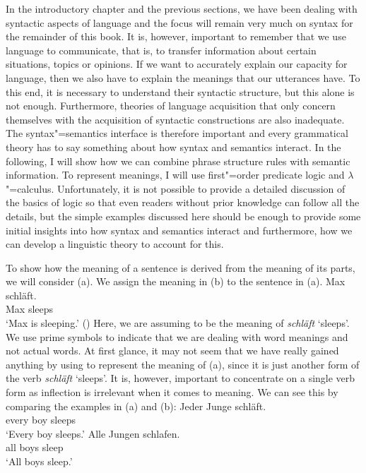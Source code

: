 In the introductory chapter and the previous sections, we have been dealing with syntactic aspects
of language and the focus will remain very much on syntax for the remainder of this book. It is,
however, important to remember that we use language to communicate, that is, to transfer information
about certain situations, topics or opinions. If we want to accurately explain our capacity for
language, then we also have to explain the meanings that our utterances have. To this end, it is
necessary to understand their syntactic structure, but this alone is not enough. Furthermore,
theories of language acquisition that only concern themselves with the acquisition of syntactic
constructions are also inadequate. The syntax"=semantics interface
is therefore important and every grammatical theory has to say something about how syntax and
semantics interact. In the following, I will show how we can combine phrase structure rules with
semantic information. To represent meanings, I will use first"=order predicate logic and
$\lambda$"=calculus. Unfortunately, it is not possible to provide a detailed
discussion of the basics of logic so that even readers without prior knowledge can follow all the
details, but the simple examples discussed here should be enough to provide some initial
insights into how syntax and semantics interact and furthermore, how we can develop a linguistic
theory to account for this.

To show how the meaning of a sentence is derived from the meaning of its parts, we will consider (a). We
assign the meaning in (b) to the sentence in (a). 
\eal
\ex\label{Bsp-Max-schlaeft}
\gll Max schläft.\\
     Max sleeps\\
\glt `Max is sleeping.'
\ex\label{Bsp-schlafen-max} 
()
\zl
Here, we are assuming  to be the meaning of  \emph{schläft} `sleeps'. We use prime symbols to indicate
that we are dealing with word meanings and not actual words. At first glance, it may not seem that we have really gained anything
by using  to represent the meaning of (a), since it is just another form of the verb \emph{schläft} `sleeps'.
It is, however, important to concentrate on a single verb form as inflection is irrelevant when it comes to meaning. We can see this by comparing the 
examples in (a) and (b):
\eal
\ex 
\gll Jeder Junge schläft.\\
     every boy sleeps\\
\glt `Every boy sleeps.'
\ex 
\gll Alle Jungen schlafen.\\
     all boys sleep\\
\glt `All boys sleep.'	 
\zl

